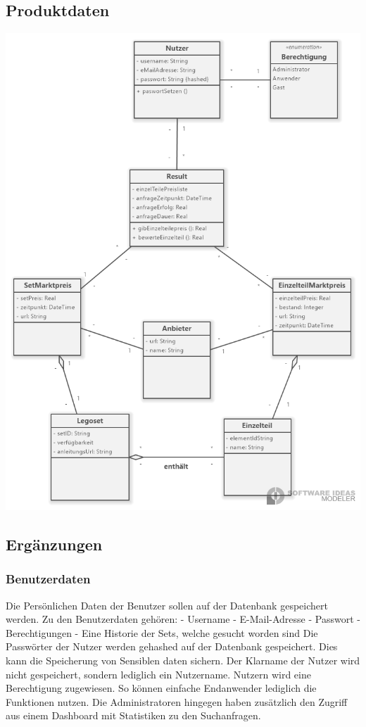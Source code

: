 \subsection{Produktdaten}
\includegraphics[width=18cm]{pictures/5.1.System.png}

\subsection{Ergänzungen}
\subsubsection{Benutzerdaten}
Die Persönlichen Daten der Benutzer sollen auf der Datenbank gespeichert werden. Zu den Benutzerdaten gehören: \newline
- Username \newline
- E-Mail-Adresse \newline
- Passwort \newline
- Berechtigungen \newline
- Eine Historie der Sets, welche gesucht worden sind \newline
Die Passwörter der Nutzer werden gehashed auf der Datenbank gespeichert. Dies kann die Speicherung von Sensiblen daten sichern. Der Klarname der Nutzer wird nicht gespeichert, sondern lediglich ein Nutzername. Nutzern wird eine Berechtigung zugewiesen. So können einfache Endanwender lediglich die Funktionen nutzen. Die Administratoren hingegen haben zusätzlich den Zugriff aus einem Dashboard mit Statistiken zu den Suchanfragen.

